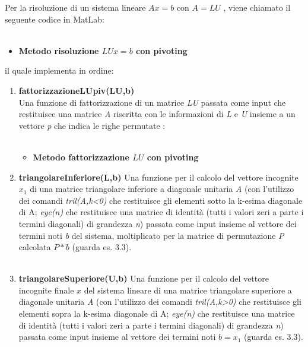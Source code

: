 Per la risoluzione di un sistema lineare $Ax=b$ con $A=LU$ , viene chiamato il seguente codice in MatLab:\\\
\begin{itemize}
\item \textbf{Metodo risoluzione $LUx=b$ con pivoting}

\end{itemize}
il quale implementa in ordine:
\begin{enumerate}
\item \textbf{fattorizzazioneLUpiv(LU,b)}\\
Una funzione di fattorizzazione di un matrice \textit{LU} passata come input che restituisce una matrice \textit{A} riscritta con le informazioni di \textit{L} e \textit{U} insieme a un vettore \textit{p} che indica le righe permutate :\\\
\begin{itemize}
\item \textbf{Metodo fattorizzazione $LU$ con pivoting}

\end{itemize}
\item \textbf{triangolareInferiore(L,b)}
Una funzione per il calcolo del vettore incognite $x_1$ di una matrice triangolare inferiore a diagonale unitaria \textit{A} (con l'utilizzo dei comandi \textit{tril(A,k<0)} che restituisce gli elementi sotto la k-esima diagonale di A; \textit{eye(n)} che restituisce una matrice di identità (tutti i valori zeri a parte i termini diagonali) di grandezza \textit{n}) passata come input insieme al vettore dei termini noti \textit{b} del sistema, moltiplicato per la matrice di permutazione \textit{P} calcolata $P*b$ (guarda es. 3.3). \\\
\item \textbf{triangolareSuperiore(U,b)}
Una funzione per il calcolo del vettore incognite finale $x$ del sistema lineare di una matrice triangolare superiore a diagonale unitaria \textit{A} (con l'utilizzo dei comandi \textit{tril(A,k>0)} che restituisce gli elementi sopra la k-esima diagonale di A; \textit{eye(n)} che restituisce una matrice di identità (tutti i valori zeri a parte i termini diagonali) di grandezza \textit{n}) passata come input insieme al vettore dei termini noti $b=x_1$ (guarda es. 3.3).\\\
\end{enumerate}